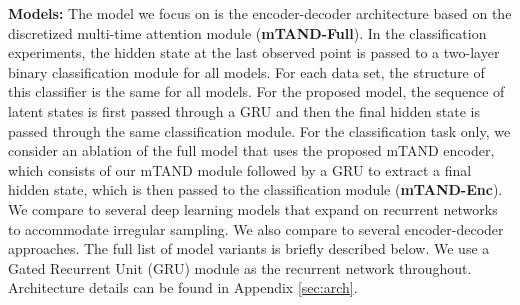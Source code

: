\documentclass{article} \usepackage{iclr2021_conference,times}
\begin{document}
\textbf{Models:} The model we focus on is the encoder-decoder architecture based on the discretized multi-time attention module (\textbf{mTAND-Full}). 
In the classification experiments, the hidden state at the last observed point is passed to a two-layer binary classification module for all models. For each data set, the structure of this classifier is the same for all models. For the proposed model, the sequence of latent states is first passed through a GRU and then the final hidden state is passed through the same classification module. For the classification task only, we consider an ablation of the full model that uses the proposed mTAND encoder, which consists of our mTAND module followed by a GRU to extract a final hidden state, which is then passed to the classification module (\textbf{mTAND-Enc}). 
We compare to several deep learning models that expand on recurrent networks to accommodate irregular sampling. We also compare to several encoder-decoder approaches. The full list of model variants is briefly described below. We use a Gated Recurrent Unit (GRU) \citep{gru} module as the recurrent network throughout. Architecture details can be found in Appendix \ref{sec:arch}. 
\end{document}
